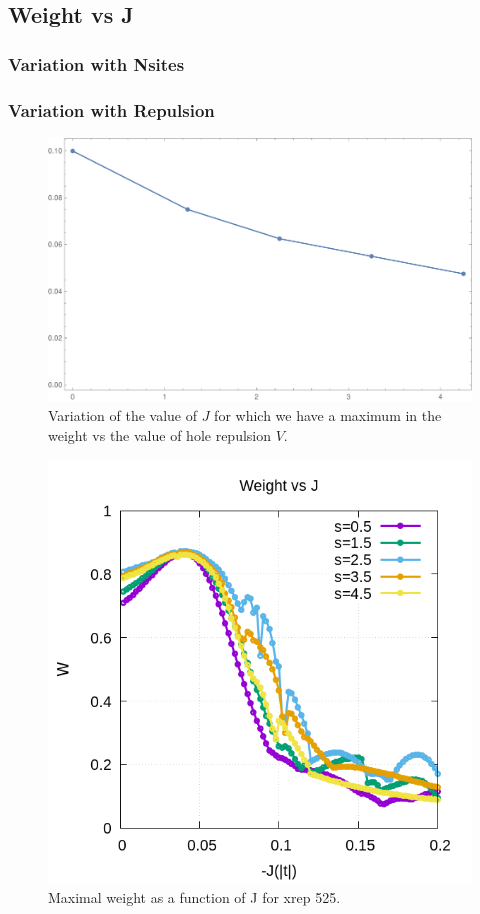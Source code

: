 \documentclass[ openright,titlepage,numbers=noenddot,headinclude,twoside,%
                footinclude=true,cleardoublepage=empty,abstractoff,%
                BCOR=5mm,paper=a4,fontsize=11pt,%
                ngerman,american,%
]{scrreprt}
\begin{document}

\subsection{Weight vs J}
\subsubsection{Variation with Nsites}
\subsubsection{Variation with Repulsion}

\begin{figure}[ht]
    \centering
    \includegraphics[scale=0.5]{12_4h_J_wmax_vs_xrep.pdf}
    \caption{\label{fig:}Variation of the value of $J$ for which we have a maximum in the weight vs the value of hole repulsion $V$. }
\end{figure}


\begin{figure}[ht]
    \centering
    \includegraphics[scale=0.5]{Wmax_vs_J_xrep525.png}
    \caption{\label{fig:}Maximal weight as a function of J for xrep 525. }
\end{figure}
\end{document}
